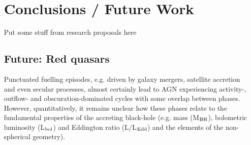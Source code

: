 
\chapter{Conclusions / Future Work}
\label{ch:conclusions} 


Put some stuff from research proposals here 

\section{Future: Red quasars}

Punctuated fuelling episodes, e.g. driven by galaxy mergers, satellite accretion and even secular processes,
almost certainly lead to AGN experiencing activity-, outflow- and obscuration-dominated cycles with some overlap between phases. 
However, quantitatively, it remains unclear how these phases relate to the fundamental properties of the accreting black-hole (e.g.  mass (M$_{\rm{BH}}$), bolometric luminosity (L$_{\rm{bol}}$) and Eddington ratio (L/L$_{\rm{Edd}}$) and the elements of the non-spherical geometry).